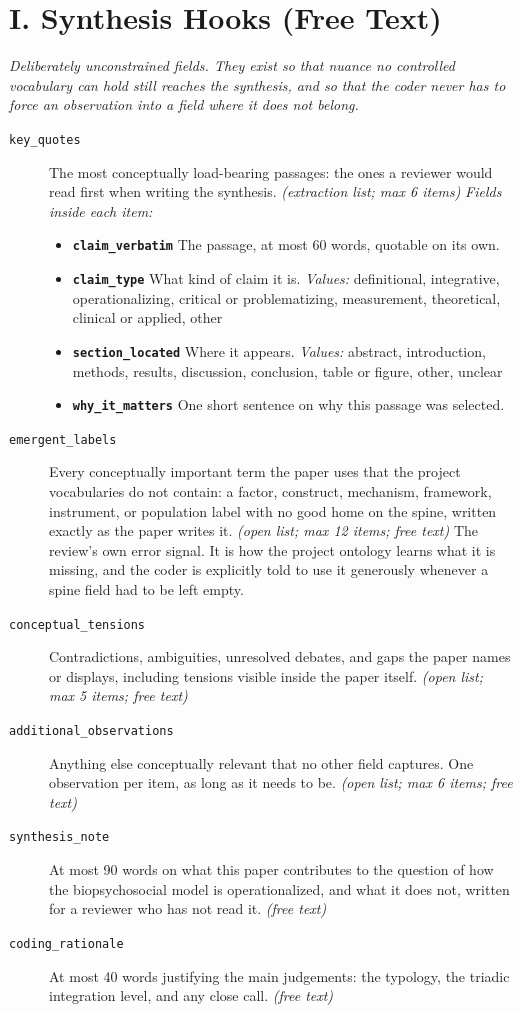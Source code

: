 \documentclass[11pt]{article}
\begin{document}
\section*{I. Synthesis Hooks (Free Text)}
{\small\itshape Deliberately unconstrained fields. They exist so that nuance no controlled vocabulary can hold still reaches the synthesis, and so that the coder never has to force an observation into a field where it does not belong.}\par\smallskip
\begin{description}
\item[\texttt{key\_quotes}] The most conceptually load-bearing passages: the ones a reviewer would read first when writing the synthesis. \textit{(extraction list; max 6 items)}
  {\small\itshape Fields inside each item:}
  \begin{itemize}[leftmargin=1.3em,itemsep=1pt,topsep=2pt]
  \item \textbf{\texttt{claim\_verbatim}} The passage, at most 60 words, quotable on its own.
  \item \textbf{\texttt{claim\_type}} What kind of claim it is. {\small \textit{Values:} definitional, integrative, operationalizing, critical or problematizing, measurement, theoretical, clinical or applied, other}
  \item \textbf{\texttt{section\_located}} Where it appears. {\small \textit{Values:} abstract, introduction, methods, results, discussion, conclusion, table or figure, other, unclear}
  \item \textbf{\texttt{why\_it\_matters}} One short sentence on why this passage was selected.
  \end{itemize}
\item[\texttt{emergent\_labels}] Every conceptually important term the paper uses that the project vocabularies do not contain: a factor, construct, mechanism, framework, instrument, or population label with no good home on the spine, written exactly as the paper writes it. \textit{(open list; max 12 items; free text)}
{\small The review's own error signal. It is how the project ontology learns what it is missing, and the coder is explicitly told to use it generously whenever a spine field had to be left empty.}
\item[\texttt{conceptual\_tensions}] Contradictions, ambiguities, unresolved debates, and gaps the paper names or displays, including tensions visible inside the paper itself. \textit{(open list; max 5 items; free text)}
\item[\texttt{additional\_observations}] Anything else conceptually relevant that no other field captures. One observation per item, as long as it needs to be. \textit{(open list; max 6 items; free text)}
\item[\texttt{synthesis\_note}] At most 90 words on what this paper contributes to the question of how the biopsychosocial model is operationalized, and what it does not, written for a reviewer who has not read it. \textit{(free text)}
\item[\texttt{coding\_rationale}] At most 40 words justifying the main judgements: the typology, the triadic integration level, and any close call. \textit{(free text)}
\end{description}
\end{document}
